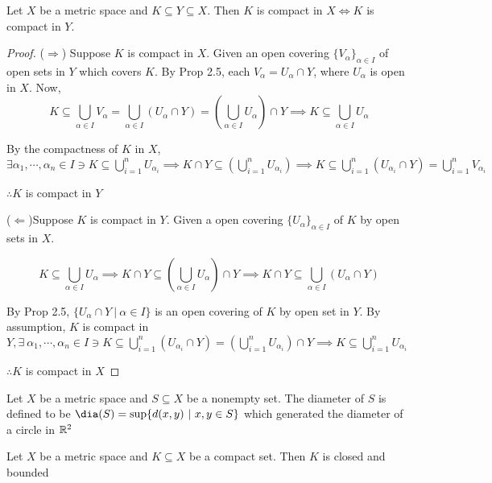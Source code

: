 \setcounter{thm}{9}

\begin{thm}
	Let $X$ be a metric space and $K \subseteq Y \subseteq X$. Then $K$ is compact in $X \Leftrightarrow K$ is compact in $Y$.
\end{thm}

\begin{proof}
	($\Rightarrow$) Suppose $K$ is compact in $X$. Given an open covering $\{V_{\alpha}\}_{\alpha \in I}$ of open sets in $Y$ which covers $K$. By Prop 2.5, each $V_{\alpha} = U_{\alpha} \cap Y$, where $U_{\alpha}$ is open in $X$. Now, 
	$$K \subseteq \bigcup_{\alpha \in I}V_{\alpha} = \bigcup_{\alpha \in I}(U_{\alpha} \cap Y) = (\bigcup_{\alpha \in I}U_{\alpha}) \cap Y \implies K \subseteq \bigcup_{\alpha \in I}U_{\alpha}$$
	
	By the compactness of $K$ in $X$, $\exists \alpha_1 ,\cdots ,\alpha_n \in I \ni K \subseteq \bigcup^n_{i=1}U_{\alpha_i} \implies K \cap Y \subseteq (\bigcup_{i=1}^{n}U_{\alpha_i}) \implies K \subseteq \bigcup_{i = 1}^n(U_{\alpha_i} \cap Y) = \bigcup^n_{i=1}V_{\alpha_i}$

	$\therefore K$ is compact in $Y$
	
	($\Leftarrow$)Suppose $K$ is compact in $Y$. Given a open covering $\{U_{\alpha}\}_{\alpha \in I}$ of $K$ by open sets in $X$. 
	
	$$K \subseteq \bigcup_{\alpha \in I}U_{\alpha} \implies K \cap Y \subseteq (\bigcup_{\alpha \in I}U_{\alpha})\cap Y \implies K \cap Y\subseteq \bigcup_{\alpha \in I}(U_{\alpha}\cap Y)$$
	
	By Prop 2.5, $\{U_{\alpha} \cap Y ~|~\alpha \in I\}$ is an open covering of $K$ by open set in $Y$. By assumption, $K$ is compact in $Y, \exists~\alpha_1,\cdots,\alpha_n \in I \ni K \subseteq \bigcup^n_{i=1}(U_{\alpha_i} \cap Y) = (\bigcup^n_{i=1}U_{\alpha_i}) \cap Y \implies K \subseteq \bigcup^n_{i=1}U_{\alpha_i}$
	
	$\therefore K$ is compact in $X$
\end{proof}

\begin{defn}
	Let $X$ be a metric space and $S \subseteq X$ be a nonempty set. The diameter of $S$ is defined to be $\dia (S) = \sup \{d(x,y)~|~x,y \in S\}$ which generated the diameter of a circle in $\mathbb{R}^2$
\end{defn}

\begin{thm}
	Let $X$ be a metric space and $K \subseteq X$ be a compact set. Then $K$ is closed and bounded
\end{thm}

